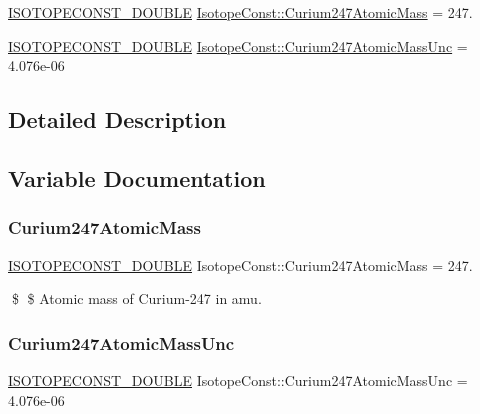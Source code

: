 \begin{DoxyCompactItemize}
\item 
\mbox{\hyperlink{group___isotope_const-_macros_ga8f45a7272ce02c0b4c65c44636ed719a}{I\+S\+O\+T\+O\+P\+E\+C\+O\+N\+S\+T\+\_\+\+D\+O\+U\+B\+LE}} \mbox{\hyperlink{group___isotope_const-_curium-_cm247_ga720267f7716225beb2d384cc5b78c233}{Isotope\+Const\+::\+Curium247\+Atomic\+Mass}} = 247.
\item 
\mbox{\hyperlink{group___isotope_const-_macros_ga8f45a7272ce02c0b4c65c44636ed719a}{I\+S\+O\+T\+O\+P\+E\+C\+O\+N\+S\+T\+\_\+\+D\+O\+U\+B\+LE}} \mbox{\hyperlink{group___isotope_const-_curium-_cm247_gaadb8a3ddc84d2920450395adbdbdec75}{Isotope\+Const\+::\+Curium247\+Atomic\+Mass\+Unc}} = 4.\+076e-\/06
\end{DoxyCompactItemize}


\subsection{Detailed Description}


\subsection{Variable Documentation}
\mbox{\label{group___isotope_const-_curium-_cm247_ga720267f7716225beb2d384cc5b78c233}} 
\subsubsection{\texorpdfstring{Curium247\+Atomic\+Mass}{Curium247AtomicMass}}
{\footnotesize\ttfamily \mbox{\hyperlink{group___isotope_const-_macros_ga8f45a7272ce02c0b4c65c44636ed719a}{I\+S\+O\+T\+O\+P\+E\+C\+O\+N\+S\+T\+\_\+\+D\+O\+U\+B\+LE}} Isotope\+Const\+::\+Curium247\+Atomic\+Mass = 247.}

\$ \$ Atomic mass of Curium-\/247 in amu. \mbox{\label{group___isotope_const-_curium-_cm247_gaadb8a3ddc84d2920450395adbdbdec75}} 
\subsubsection{\texorpdfstring{Curium247\+Atomic\+Mass\+Unc}{Curium247AtomicMassUnc}}
{\footnotesize\ttfamily \mbox{\hyperlink{group___isotope_const-_macros_ga8f45a7272ce02c0b4c65c44636ed719a}{I\+S\+O\+T\+O\+P\+E\+C\+O\+N\+S\+T\+\_\+\+D\+O\+U\+B\+LE}} Isotope\+Const\+::\+Curium247\+Atomic\+Mass\+Unc = 4.\+076e-\/06}

